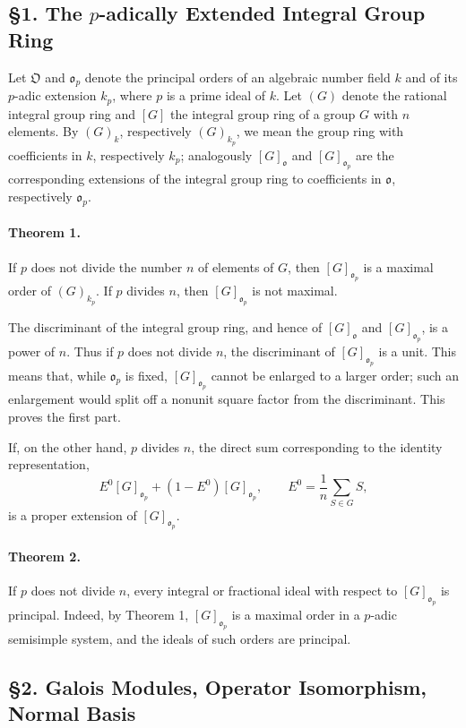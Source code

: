 \documentclass[11pt]{article}
\providecommand{\frako}{\mathfrak o}
\providecommand{\frakO}{\mathfrak O}
\begin{document}
\subsection*{§1. The \(p\)-adically Extended Integral Group Ring}

Let \(\frakO\) and \(\frako_p\) denote the principal orders of an algebraic number field \(k\) and of its \(p\)-adic extension \(k_p\), where \(p\) is a prime ideal of \(k\). Let \((G)\) denote the rational integral group ring and \([G]\) the integral group ring of a group \(G\) with \(n\) elements. By \((G)_k\), respectively \((G)_{k_p}\), we mean the group ring with coefficients in \(k\), respectively \(k_p\); analogously \([G]_{\frako}\) and \([G]_{\frako_p}\) are the corresponding extensions of the integral group ring to coefficients in \(\frako\), respectively \(\frako_p\).

\paragraph{Theorem 1.}
If \(p\) does not divide the number \(n\) of elements of \(G\), then \([G]_{\frako_p}\) is a maximal order of \((G)_{k_p}\). If \(p\) divides \(n\), then \([G]_{\frako_p}\) is not maximal.

The discriminant of the integral group ring, and hence of \([G]_{\frako}\) and \([G]_{\frako_p}\), is a power of \(n\). Thus if \(p\) does not divide \(n\), the discriminant of \([G]_{\frako_p}\) is a unit. This means that, while \(\frako_p\) is fixed, \([G]_{\frako_p}\) cannot be enlarged to a larger order; such an enlargement would split off a nonunit square factor from the discriminant. This proves the first part.

If, on the other hand, \(p\) divides \(n\), the direct sum corresponding to the identity representation,
\[
        E^0 [G]_{\frako_p}+(1-E^0)[G]_{\frako_p},
        \qquad
        E^0=\frac1n\sum_{S\in G}S,
\]
is a proper extension of \([G]_{\frako_p}\).

\paragraph{Theorem 2.}
If \(p\) does not divide \(n\), every integral or fractional ideal with respect to \([G]_{\frako_p}\) is principal. Indeed, by Theorem 1, \([G]_{\frako_p}\) is a maximal order in a \(p\)-adic semisimple system, and the ideals of such orders are principal.

\subsection*{§2. Galois Modules, Operator Isomorphism, Normal Basis}
\end{document}
